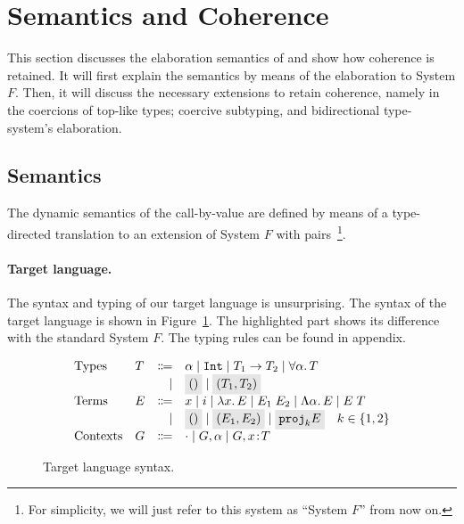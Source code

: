 \section{Semantics and Coherence}
\label{sec:disjoint}

This section discusses the elaboration semantics of \name and show how coherence is retained.
It will first explain the semantics by means of the elaboration to System $F$.
Then, it will discuss the necessary extensions to retain coherence, namely in the coercions of 
top-like types; coercive subtyping, and bidirectional type-system's elaboration. 

\subsection{Semantics}
The dynamic semantics of the call-by-value \name are defined by means of
a type-directed translation to an extension of System $F$ with pairs~\footnote{
  For simplicity, we will just refer to this system as ``System $F$''
  from now on.}.


\paragraph{Target language.}
The syntax and typing of our target language is unsurprising. The syntax of the
target language is shown in Figure~\ref{fig:f-syntax}. The highlighted part
shows its difference with the standard System $F$. 
The typing rules can be found in appendix.

\begin{figure}[!t]
  \[
    \begin{array}{llrl}
      \text{Types}    & T & \Coloneqq & \alpha \mid \tyint \mid {T_1} \to {T_2} \mid \for \alpha T\\
                      &   & \mid      & \highlight {$()$} \mid \highlight {$\pair {T_1} {T_2}$} \\
      \text{Terms}    & E & \Coloneqq & x \mid i \mid \lamty x T E \mid \app {E_1} {E_2} \mid 
                                        \blam \alpha E \mid \tapp E T \\
                      &   & \mid      & \highlight {$()$} \mid \highlight {$ \pair {E_1} {E_2} $} 
                                        \mid \highlight {$ \proj k E $} \quad k \in \{ 1, 2 \} \\
      \text{Contexts} & G & \Coloneqq & \cdot \mid G, \alpha \mid G, x \oftype T \\
    \end{array}
  \]
  \caption{Target language syntax.}
  \label{fig:f-syntax}
\end{figure}

